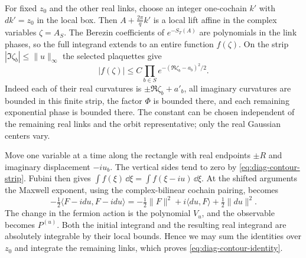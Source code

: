 For fixed $z_0$ and the other real links, choose an integer
one-cochain $k'$ with $dk'=z_0$ in the local box. Then
$A+\frac{2\pi}{q}k'$ is a local lift affine in the complex
variables $\zeta=A_S$.
The Berezin coefficients of $e^{-S_T(A)}$ are polynomials
in the link phases, so the full integrand extends to an
entire function $f(\zeta)$. On the strip
$|\Im\zeta_b|\le\|u\|_\infty$ the selected plaquettes give
\begin{equation}\label{eq:diag-contour-strip}
 |f(\zeta)|\le C
          \prod_{b\in S}e^{-(\Re\zeta_b-a_b)^2/2}.
\end{equation}
Indeed each of their real curvatures is $\pm\Re\zeta_b+a'_b$,
all imaginary curvatures are bounded in this finite strip,
the factor $\Phi$ is bounded there, and each remaining
exponential phase is bounded there. The constant can be
chosen independent of the remaining real links and the
orbit representative; only the real Gaussian centers vary.

Move one variable at a time along the rectangle with real
endpoints $\pm R$ and imaginary displacement $-iu_b$. The
vertical sides tend to zero by \eqref{eq:diag-contour-strip}.
Fubini then gives $\int f(\xi)\,\dd\xi=
\int f(\xi-iu)\,\dd\xi$. At the shifted arguments the
Maxwell exponent, using the complex-bilinear cochain pairing, becomes
\[
 -\tfrac12\langle F-idu,F-idu\rangle
       =-\tfrac12\|F\|^2+i\langle du,F\rangle+\tfrac12\|du\|^2.
\]
The change in the fermion action is the polynomial $V_u$,
and the observable becomes $P^{(u)}$. Both the initial
integrand and the resulting real integrand are absolutely
integrable by their local bounds. Hence we may sum the
identities over $z_0$ and integrate the remaining links,
which proves \eqref{eq:diag-contour-identity}.

